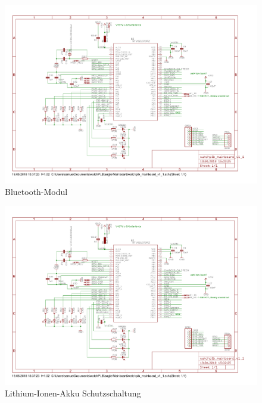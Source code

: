 \documentclass[a4paper]{scrartcl}
\begin{document}
\begin{figure}[htb]\centering
\includegraphics[page=3, angle=90, width=\linewidth]{../Mainboard/watchplb_mainboard_v1_1.pdf}
\caption{Bluetooth-Modul}
\label{fig:abb1}
\end{figure}

\begin{figure}[htb]\centering
\includegraphics[page=5, angle=90, width=\linewidth]{../Mainboard/watchplb_mainboard_v1_1.pdf}
\caption{Lithium-Ionen-Akku Schutzschaltung}
\label{fig:abb1}
\end{figure}
\end{document}
